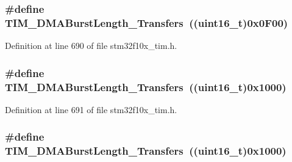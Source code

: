 \subsubsection[{\texorpdfstring{T\+I\+M\+\_\+\+D\+M\+A\+Burst\+Length\+\_\+16\+Transfers}{TIM_DMABurstLength_16Transfers}}]{\setlength{\rightskip}{0pt plus 5cm}\#define T\+I\+M\+\_\+\+D\+M\+A\+Burst\+Length\+\_\+Transfers~(({\bf uint16\+\_\+t})0x0\+F00)}\hypertarget{group___t_i_m___d_m_a___burst___length_gafb644e6033f7b46c602b02754b69fde0}{}\label{group___t_i_m___d_m_a___burst___length_gafb644e6033f7b46c602b02754b69fde0}


Definition at line 690 of file stm32f10x\+\_\+tim.\+h.

\subsubsection[{\texorpdfstring{T\+I\+M\+\_\+\+D\+M\+A\+Burst\+Length\+\_\+17\+Transfers}{TIM_DMABurstLength_17Transfers}}]{\setlength{\rightskip}{0pt plus 5cm}\#define T\+I\+M\+\_\+\+D\+M\+A\+Burst\+Length\+\_\+Transfers~(({\bf uint16\+\_\+t})0x1000)}\hypertarget{group___t_i_m___d_m_a___burst___length_ga5b2c97f650a3c1726965187d852b8cc5}{}\label{group___t_i_m___d_m_a___burst___length_ga5b2c97f650a3c1726965187d852b8cc5}


Definition at line 691 of file stm32f10x\+\_\+tim.\+h.

\subsubsection[{\texorpdfstring{T\+I\+M\+\_\+\+D\+M\+A\+Burst\+Length\+\_\+17\+Transfers}{TIM_DMABurstLength_17Transfers}}]{\setlength{\rightskip}{0pt plus 5cm}\#define T\+I\+M\+\_\+\+D\+M\+A\+Burst\+Length\+\_\+Transfers~(({\bf uint16\+\_\+t})0x1000)}\hypertarget{group___t_i_m___d_m_a___burst___length_ga5b2c97f650a3c1726965187d852b8cc5}{}\label{group___t_i_m___d_m_a___burst___length_ga5b2c97f650a3c1726965187d852b8cc5}


